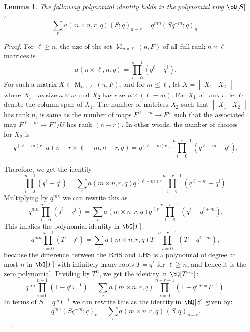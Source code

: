 \documentclass[reqno]{amsart}
\newtheorem{lemma}[theorem]{Lemma}
\theoremstyle{definition}
\theoremstyle{remark}
\numberwithin{equation}{section}
\DeclareMathOperator{\M}{M}
\DeclareMathOperator{\End}{End}
\begin{document}
\begin{lemma} \label{amnr_lemma}
The following polynomial identity holds in the polynomial ring  $\bQ[S]$:
\[\sum_r a(m \times n,r, q) (S;q)_{n-r}= q^{mn} (Sq^{-m};q)_n.\] 
\end{lemma}
\begin{proof}
For $\ell \geq n$, the size of the set $\M_{n \times \ell}(n,F)$ of all full rank $n \times \ell $ matrices is 
 \[ a( n\times \ell, n,q)=\prod_{i=0}^{n-1} (q^\ell-q^i).\]
 For such a matrix $X \in \M_{n \times \ell}(n,F)$, and for $m \leq \ell$,  let $X=\begin{bmatrix}  X_1 &  X_2 \end{bmatrix}$ where $X_1$ has size $n \times m$ and $X_2$ has size $ n \times (\ell-m)$. 
For $X_1$ of rank $r$, let $U$ denote the column span of $X_1$. The number of matrices $X_2$ such that 
$\begin{bmatrix}  X_1 &  X_2 \end{bmatrix}$ has rank $n$, is same as the number of maps $F^{\ell-m} \to F^n$ such that the associated map $F^{\ell-m} \to F^n/U$ has rank $(n-r)$. In other words, the number of choices for $X_2$ is \[ q^{(\ell-m)r} \cdot a(n-r \times \ell-m, n-r, q)= q^{(\ell-m)r} \cdot \prod_{i=0}^{n-r-1}(q^{\ell-m}-q^i). \]
 
 
 Therefore, we get the identity
\[  \prod_{i=0}^{n-1} (q^\ell-q^i)=\sum_{r} a(m \times n, r, q) q^{(\ell-m)r} \prod_{i=0}^{n-r-1}(q^{\ell-m}-q^i). \]
Multiplying 
 by $q^{mn}$ we can rewrite this as 
 \[  q^{mn} \prod_{i=0}^{n-1} (q^\ell-q^i)=\sum_{r} a(m \times n, r, q) q^{\ell r} \prod_{i=0}^{n-r-1}(q^{\ell}-q^{i+m}). \]
This implies the polynomial identity in $\bQ[T]$:
\[
q^{mn} \prod_{i=0}^{n-1} (T-q^i)=
\sum_{r} a(m \times n, r, q) T^{r} \prod_{i=0}^{n-r-1}(T-q^{i+m}),
\]
because the difference between the RHS and LHS is a polynomial of degree at most $n$ in $\bQ[T]$ with infinitely many roots $T=q^\ell$ for $\ell \geq n$, and hence it is the  zero polynomial. Dividing by $T^n$, we get the identity in $\bQ[T^{-1}]$:
\[
q^{mn} \prod_{i=0}^{n-1} (1 -q^i T^{-1})=
\sum_{r} a(m \times n, r, q)   \prod_{i=0}^{n-r-1}(1-q^{i+m}T^{-1}).
\]
In terms of $S=q^{m}T^{-1}$ we can rewrite this as the identity in $\bQ[S]$ given by:
\[
q^{mn}(Sq^{-m};q)_n=
\sum_{r} a(m \times n, r, q) \, 
(S;q)_{n-r}.
\]
\end{proof}
\end{document}
